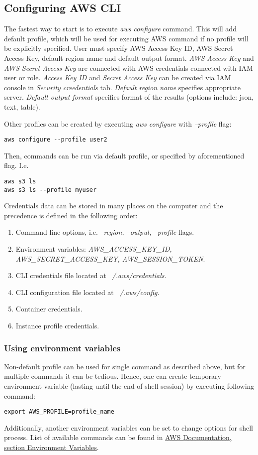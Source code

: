 \documentclass[12pt,english]{article}
\begin{document}
\subsection{Configuring AWS CLI}
The fastest way to start is to execute \textit{aws configure} command. This will add default profile, which will be used for executing AWS command if no profile will be explicitly specified. User must specify AWS Access Key ID, AWS Secret Access Key, default region name and default output format. \textit{AWS Access Key} and \textit{AWS Secret Access Key} are connected with AWS credentials connected with IAM user or role. \textit{Access Key ID} and \textit{Secret Access Key} can be created via IAM console in \textit{Security creedentials} tab. \textit{Default region name} specifies appropriate server. \textit{Default output format} specifies format of the results (options include: json, text, table).

Other profiles can be created by executing \textit{aws configure} with \textit{--profile} flag:
\begin{lstlisting}
aws configure --profile user2
\end{lstlisting}
Then, commands can be run via default profile, or specified by aforementioned flag. I.e.
\begin{lstlisting}
aws s3 ls
aws s3 ls --profile myuser
\end{lstlisting}

Credentials data can be stored in many places on the computer and the precedence is defined in the following order:
\begin{enumerate}
	\item Command line options, i.e. \textit{--region, --output, --profile} flags.
	\item Environment variables: \textit{AWS\_ACCESS\_KEY\_ID, AWS\_SECRET\_ACCESS\_KEY, AWS\_SESSION\_TOKEN}.
	\item CLI credentials file located at \textit{~/.aws/credentials}.
	\item CLI configuration file located at \textit{~/.aws/config}.
	\item Container credentials.
	\item Instance profile credentials.
\end{enumerate}

\subsubsection*{Using environment variables}
Non-default profile can be used for single command as described above, but for multiple commands it can be tedious. Hence, one can create temporary environment variable (lasting until the end of shell session) by executing following command:
\begin{lstlisting}
export AWS_PROFILE=profile_name
\end{lstlisting}
Additionally, another environment variables can be set to change options for shell process. List of available commands can be found in \href{https://en.wikibooks.org/wiki/LaTeX/Hyperlinks}{AWS Documentation, section Environment Variables}.
\end{document}
